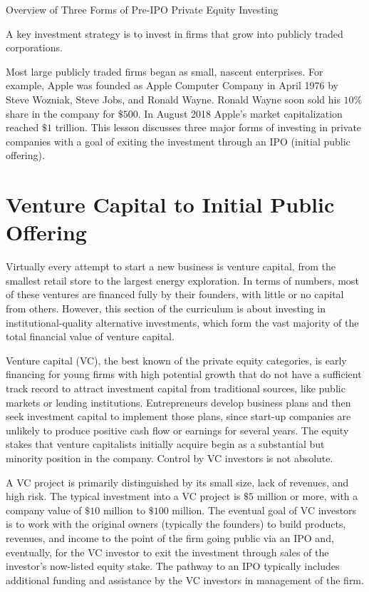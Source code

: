 \documentclass[11pt]{article}
\begin{document}
Overview of Three Forms of Pre-IPO Private Equity Investing

A key investment strategy is to invest in firms that grow into publicly traded corporations.

Most large publicly traded firms began as small, nascent enterprises. For example, Apple was founded as Apple Computer Company in April 1976 by Steve Wozniak, Steve Jobs, and Ronald Wayne. Ronald Wayne soon sold his $10 \%$ share in the company for $\$ 500$. In August 2018 Apple's market capitalization reached $\$ 1$ trillion. This lesson discusses three major forms of investing in private companies with a goal of exiting the investment through an IPO (initial public offering).

\section*{Venture Capital to Initial Public Offering}
Virtually every attempt to start a new business is venture capital, from the smallest retail store to the largest energy exploration. In terms of numbers, most of these ventures are financed fully by their founders, with little or no capital from others. However, this section of the curriculum is about investing in institutional-quality alternative investments, which form the vast majority of the total financial value of venture capital.

Venture capital (VC), the best known of the private equity categories, is early financing for young firms with high potential growth that do not have a sufficient track record to attract investment capital from traditional sources, like public markets or lending institutions. Entrepreneurs develop business plans and then seek investment capital to implement those plans, since start-up companies are unlikely to produce positive cash flow or earnings for several years. The equity stakes that venture capitalists initially acquire begin as a substantial but minority position in the company. Control by VC investors is not absolute.

A VC project is primarily distinguished by its small size, lack of revenues, and high risk. The typical investment into a VC project is $\$ 5$ million or more, with a company value of $\$ 10$ million to $\$ 100$ million. The eventual goal of VC investors is to work with the original owners (typically the founders) to build products, revenues, and income to the point of the firm going public via an IPO and, eventually, for the VC investor to exit the investment through sales of the investor's now-listed equity stake. The pathway to an IPO typically includes additional funding and assistance by the VC investors in management of the firm.
\end{document}
